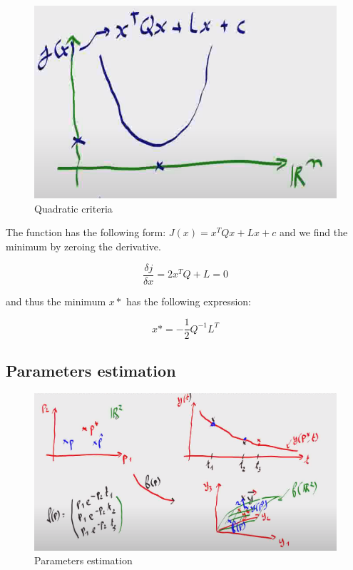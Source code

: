 \begin{figure}[H]
    \centering
    \includegraphics[scale=0.3]{content/minimization_quadratic.png}
    \caption{Quadratic criteria}
    \label{fig:minimization_quadratic}
\end{figure}

The function has the following form: $J(x) = x^T Q x + Lx + c$ and we find the minimum by zeroing the derivative.

\begin{equation}
    \frac{\delta j}{\delta x} = 2 x^T Q + L = 0
\end{equation}

and thus the minimum $x*$ has the following expression:

\begin{equation}
    x* = -\frac{1}{2}Q^{-1}L^T
\end{equation}




\subsection{Parameters estimation}

\begin{figure}[H]
    \centering
    \includegraphics[width=\linewidth]{content/params_estimation.png}
    \caption{Parameters estimation}
    \label{fig:params_estimation}
\end{figure}


